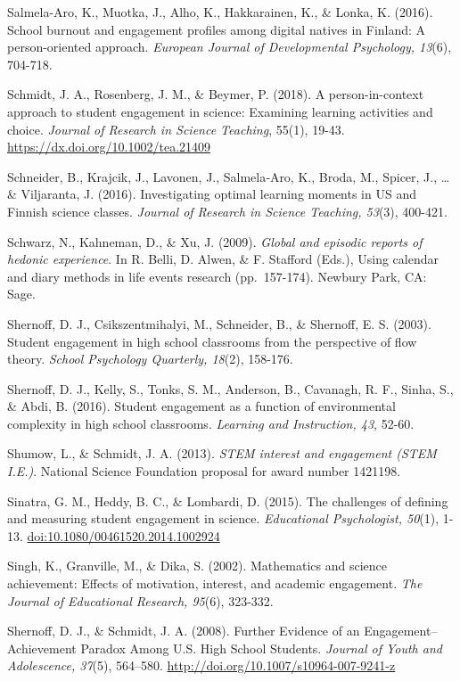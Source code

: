 \documentclass[]{book}
\theoremstyle{definition}
\theoremstyle{definition}
\theoremstyle{definition}
\theoremstyle{remark}
\begin{document}
Salmela-Aro, K., Muotka, J., Alho, K., Hakkarainen, K., \& Lonka, K.
(2016). School burnout and engagement profiles among digital natives in
Finland: A person-oriented approach. \emph{European Journal of
Developmental Psychology, 13}(6), 704-718.

Schmidt, J. A., Rosenberg, J. M., \& Beymer, P. (2018). A
person-in-context approach to student engagement in science: Examining
learning activities and choice. \emph{Journal of Research in Science
Teaching}, 55(1), 19-43. \url{https://dx.doi.org/10.1002/tea.21409}

Schneider, B., Krajcik, J., Lavonen, J., Salmela‐Aro, K., Broda, M.,
Spicer, J., \ldots{} \& Viljaranta, J. (2016). Investigating optimal
learning moments in US and Finnish science classes. \emph{Journal of
Research in Science Teaching, 53}(3), 400-421.

Schwarz, N., Kahneman, D., \& Xu, J. (2009). \emph{Global and episodic
reports of hedonic experience}. In R. Belli, D. Alwen, \& F. Stafford
(Eds.), Using calendar and diary methods in life events research
(pp.~157-174). Newbury Park, CA: Sage.

Shernoff, D. J., Csikszentmihalyi, M., Schneider, B., \& Shernoff, E. S.
(2003). Student engagement in high school classrooms from the
perspective of flow theory. \emph{School Psychology Quarterly, 18}(2),
158-176.

Shernoff, D. J., Kelly, S., Tonks, S. M., Anderson, B., Cavanagh, R. F.,
Sinha, S., \& Abdi, B. (2016). Student engagement as a function of
environmental complexity in high school classrooms. \emph{Learning and
Instruction, 43}, 52-60.

Shumow, L., \& Schmidt, J. A. (2013). \emph{STEM interest and engagement
(STEM I.E.)}. National Science Foundation proposal for award number
1421198.

Sinatra, G. M., Heddy, B. C., \& Lombardi, D. (2015). The challenges of
defining and measuring student engagement in science. \emph{Educational
Psychologist, 50}(1), 1-13. \url{doi:10.1080/00461520.2014.1002924}

Singh, K., Granville, M., \& Dika, S. (2002). Mathematics and science
achievement: Effects of motivation, interest, and academic engagement.
\emph{The Journal of Educational Research, 95}(6), 323-332.

Shernoff, D. J., \& Schmidt, J. A. (2008). Further Evidence of an
Engagement--Achievement Paradox Among U.S. High School Students.
\emph{Journal of Youth and Adolescence, 37}(5), 564--580.
\url{http://doi.org/10.1007/s10964-007-9241-z}
\end{document}
